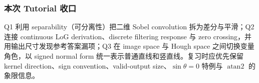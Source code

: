 \subsubsection*{本次 Tutorial 收口}

Q1 利用 separability（可分离性）把二维 Sobel convolution 拆为差分与平滑；Q2 连接 continuous LoG derivation、discrete filtering response 与 zero crossing，并用输出尺寸发现参考答案漏项；Q3 在 image space 与 Hough space 之间切换变量角色，以 signed normal form 统一表示普通直线和竖直线。复习时应优先保留 kernel direction、sign convention、valid-output size、$\sin\theta=0$ 特例与 $\operatorname{atan2}$ 的象限信息。
